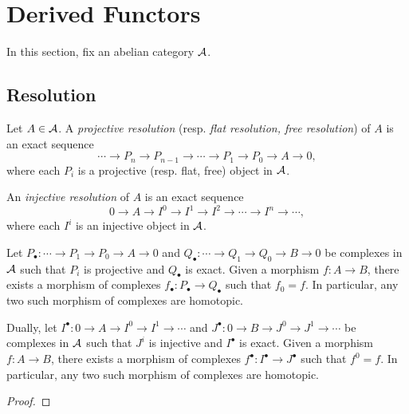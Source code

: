 \section{Derived Functors}

In this section, fix an abelian category \({\mathcal{A}}\).

\subsection{Resolution}

    \begin{definition}[Resolution]
        Let \(A \in {\mathcal{A}}\).
        A \emph{projective resolution} (resp. \emph{flat resolution, free resolution}) of \(A\) is an exact sequence
        \[ \cdots \to P_n \to P_{n-1} \to \cdots \to P_1 \to P_0 \to A \to 0,\]
        where each \(P_i\) is a projective (resp. flat, free) object in \({\mathcal{A}}\).
        
        An \emph{injective resolution} of \(A\) is an exact sequence
        \[ 0 \to A \to I^0 \to I^1 \to I^2 \to \cdots \to I^n \to \cdots, \]
        where each \(I^i\) is an injective object in \({\mathcal{A}}\).
    \end{definition}

    \begin{proposition}\label{prop: morphism induces morphism of resolution complexes}
        Let \(P_\bullet: \cdots \to P_1 \to P_0 \to A \to 0\) and \(Q_\bullet: \cdots \to Q_1 \to Q_0 \to B \to 0\) be complexes in \({\mathcal{A}}\) such that \(P_i\) is projective and \(Q_\bullet\) is exact. 
        Given a morphism \(f: A \to B\), there exists a morphism of complexes \(f_\bullet: P_\bullet \to Q_\bullet\) such that \(f_0 = f\).
        In particular, any two such morphism of complexes are homotopic.

        Dually, let \(I^\bullet: 0 \to A \to I^0 \to I^1 \to \cdots\) and \(J^\bullet: 0 \to B \to J^0 \to J^1 \to \cdots\) be complexes in \({\mathcal{A}}\) such that \(J^i\) is injective and \(I^\bullet\) is exact.
        Given a morphism \(f: A \to B\), there exists a morphism of complexes \(f^\bullet: I^\bullet \to J^\bullet\) such that \(f^0 = f\).
        In particular, any two such morphism of complexes are homotopic.
    \end{proposition}
    \begin{proof}
    \end{proof}

